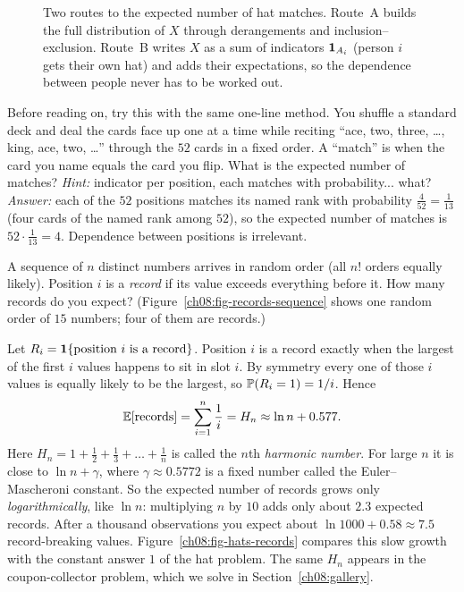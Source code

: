 \begin{figure}[H]
\caption{Two routes to the expected number of hat matches. Route~A builds the full distribution of $X$ through derangements and inclusion--exclusion. Route~B writes $X$ as a sum of indicators $\ind_{A_i}$ (person $i$ gets their own hat) and adds their expectations, so the dependence between people never has to be worked out.}
\label{ch08:fig-indicator-bypass}
\end{figure}

\begin{labbox}
Before reading on, try this with the same one-line method. You shuffle a standard
deck and deal the cards face up one at a time while reciting ``ace, two, three,
\dots, king, ace, two, \dots'' through the $52$ cards in a fixed order. A
``match'' is when the card you name equals the card you flip. What is the expected
number of matches? \emph{Hint:} indicator per position, each matches with
probability... what? \\[2pt]
\emph{Answer:} each of the $52$ positions matches its named rank with probability
$\tfrac{4}{52}=\tfrac1{13}$ (four cards of the named rank among $52$), so the
expected number of matches is $52\cdot\tfrac1{13} = 4$. Dependence between
positions is irrelevant.
\end{labbox}

\begin{example}
\label{ch08:ex-records}
A sequence of $n$ distinct numbers arrives in random order (all $n!$ orders
equally likely). Position $i$ is a \emph{record} if its value exceeds everything
before it. How many records do you expect? (Figure~\ref{ch08:fig-records-sequence}
shows one random order of $15$ numbers; four of them are records.)

Let $R_i = \ind\{\text{position } i \text{ is a record}\}$. Position $i$ is a
record exactly when the largest of the first $i$ values happens to sit in slot
$i$. By symmetry every one of those $i$ values is equally likely to be the
largest, so $\P(R_i = 1) = 1/i$. Hence
\[
  \E[\text{records}] = \sum_{i=1}^n \frac1i = H_n \approx \ln n + 0.577.
\]
Here $H_n = 1 + \tfrac12 + \tfrac13 + \dots + \tfrac1n$ is called the $n$th
\emph{harmonic number}. For large $n$ it is close to $\ln n + \gamma$, where
$\gamma \approx 0.5772$ is a fixed number called the Euler--Mascheroni constant.
So the expected number of records grows only \emph{logarithmically}, like $\ln
n$: multiplying $n$ by $10$ adds only about $2.3$ expected records. After a
thousand observations you expect about $\ln 1000 + 0.58 \approx 7.5$
record-breaking values. Figure~\ref{ch08:fig-hats-records} compares this slow
growth with the constant answer $1$ of the hat problem. The same $H_n$ appears
in the coupon-collector problem, which we solve in Section~\ref{ch08:gallery}.
\end{example}

